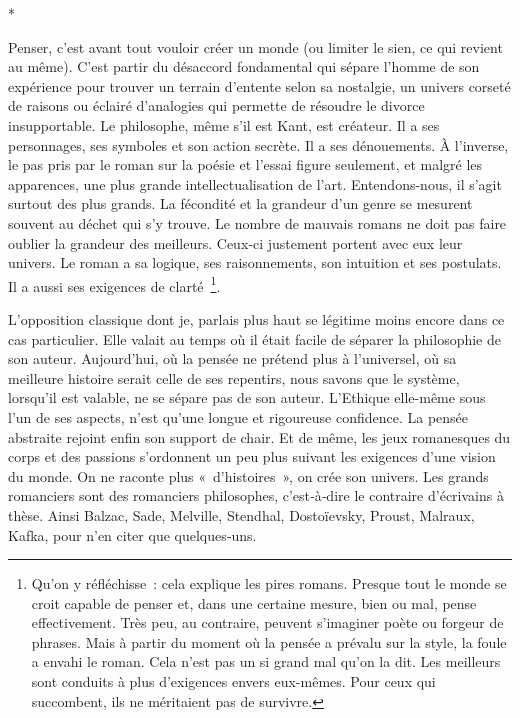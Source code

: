 \documentclass{book}
\begin{document}
\begin{center}
*
\end{center}

Penser, c'est avant tout vouloir créer un monde (ou limiter le sien, ce qui revient au même). C'est partir du désaccord fondamental qui sépare l'homme de son expérience pour trouver un terrain d'entente selon sa nostalgie, un univers corseté de raisons ou éclairé d'analogies qui permette de résoudre le divorce insupportable. Le philosophe, même s'il est Kant, est créateur. Il a ses personnages, ses symboles et son action secrète. Il a ses dénouements. À l'inverse, le pas pris par le roman sur la poésie et l'essai figure seulement, et malgré les apparences, une plus grande  intellectualisation de l'art. Entendons-nous, il s'agit surtout des plus grands. La fécondité et la grandeur d'un genre se mesurent souvent au déchet qui s'y trouve. Le nombre de mauvais romans ne doit pas faire oublier la grandeur des meilleurs. Ceux‑ci justement portent avec eux leur univers. Le roman a sa logique, ses raisonnements, son intuition et ses postulats. Il a aussi ses exigences de clarté \footnote{Qu'on y réfléchisse : cela explique les pires romans. Presque tout le monde se croit capable de penser et, dans une certaine mesure, bien ou mal, pense effectivement. Très peu, au contraire, peuvent s'imaginer poète ou forgeur de phrases. Mais à partir du moment où la pensée a prévalu sur la style, la foule a envahi le roman. Cela n'est pas un si grand mal qu'on la dit. Les meilleurs sont conduits à plus d'exigences envers eux-mêmes. Pour ceux qui succombent, ils ne méritaient pas de survivre.}.

L'opposition classique dont je, parlais plus haut se légitime moins encore dans ce cas particulier. Elle valait au temps où il était facile de séparer la philosophie de son auteur. Aujourd'hui, où la pensée ne prétend plus à l'universel, où sa meilleure histoire serait celle de ses repentirs, nous savons que le système, lorsqu'il est valable, ne se sépare pas de son auteur. L'Ethique elle-même sous l'un de ses aspects, n'est qu'une longue et rigoureuse confidence. La pensée abstraite rejoint enfin son support de chair. Et de même, les jeux romanesques du corps et des passions s'ordonnent un peu plus suivant les exigences d'une vision du monde. On ne raconte plus « d'histoires », on crée son univers. Les grands romanciers sont des romanciers philosophes, c'est‑à‑dire le contraire d'écrivains à thèse. Ainsi Balzac, Sade, Melville, Stendhal, Dostoïevsky, Proust, Malraux, Kafka, pour n'en citer que quelques‑uns.
\end{document}
